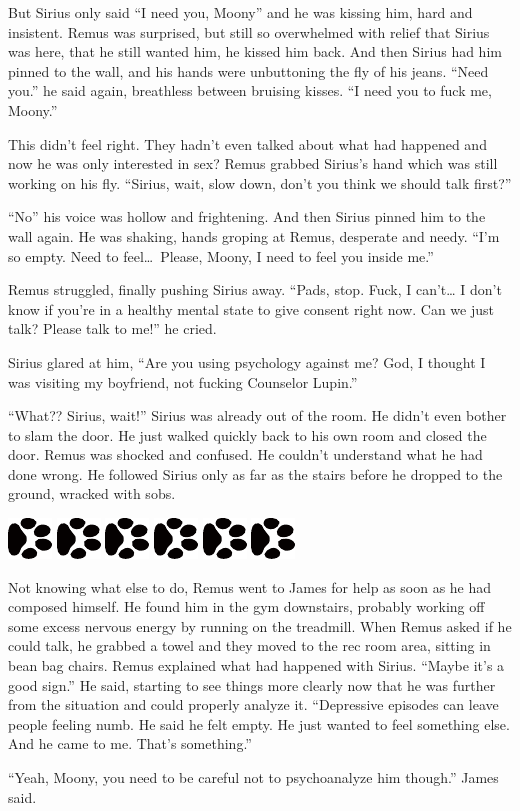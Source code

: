 \documentclass[12pt,twoside,openright]{memoir}
\newcommand{\myrulez}{	
	\begin{center}
		\hspace{.5em}
		\includegraphics[angle=60]{dogprint.pdf}
		\hspace{.5em}
		\includegraphics[angle=120]{dogprint.pdf}
		\hspace{.5em}
		\includegraphics[angle=60]{dogprint.pdf}
		\hspace{.5em}
		\includegraphics[angle=120]{dogprint.pdf}
		\hspace{.5em}
		\includegraphics[angle=60]{dogprint.pdf}
		\hspace{.5em}
		\includegraphics[angle=120]{dogprint.pdf}
		\hspace{.5em}
	\end{center}
}
\begin{document}
But Sirius only said ``I need you, Moony'' and he was kissing him, hard and insistent. Remus was surprised, but still so overwhelmed with relief that Sirius was here, that he still wanted him, he kissed him back. And then Sirius had him pinned to the wall, and his hands were unbuttoning the fly of his jeans. ``Need you.'' he said again, breathless between bruising kisses. ``I need you to fuck me, Moony.''

This didn't feel right. They hadn't even talked about what had happened and now he was only interested in sex? Remus grabbed Sirius's hand which was still working on his fly. ``Sirius, wait, slow down, don't you think we should talk first?''

``No'' his voice was hollow and frightening. And then Sirius pinned him to the wall again. He was shaking, hands groping at Remus, desperate and needy. ``I'm so empty. Need to feel\ldots\ Please, Moony, I need to feel you inside me.'' 

Remus struggled, finally pushing Sirius away. ``Pads, stop. Fuck, I can't… I don't know if you're in a healthy mental state to give consent right now. Can we just talk? Please talk to me!'' he cried. 

Sirius glared at him, ``Are you using psychology against me? God, I thought I was visiting my boyfriend, not fucking Counselor Lupin.'' 

``What?? Sirius, wait!'' Sirius was already out of the room. He didn't even bother to slam the door. He just walked quickly back to his own room and closed the door. Remus was shocked and confused. He couldn't understand what he had done wrong. He followed Sirius only as far as the stairs before he dropped to the ground, wracked with sobs. 

\myrulez

Not knowing what else to do, Remus went to James for help as soon as he had composed himself. He found him in the gym downstairs, probably working off some excess nervous energy by running on the treadmill. When Remus asked if he could talk, he grabbed a towel and they moved to the rec room area, sitting in bean bag chairs. Remus explained what had happened with Sirius. ``Maybe it's a good sign.'' He said, starting to see things more clearly now that he was further from the situation and could properly analyze it. ``Depressive episodes can leave people feeling numb. He said he felt empty. He just wanted to feel something else. And he came to me. That's something.''

``Yeah, Moony, you need to be careful not to psychoanalyze him though.'' James said.
\end{document}
